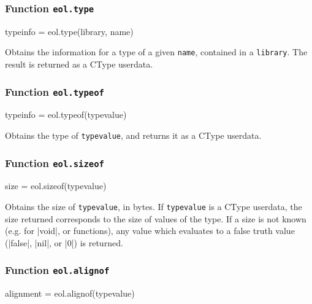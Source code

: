 \subsubsection{Function \texttt{eol.type}}
	\label{sec:eol-api-type}

\begin{luacode}
typeinfo = eol.type(library, name)
\end{luacode}

Obtains the information for a type of a given \texttt{name}, contained in
a \texttt{library}. The result is returned as a \textsf{CType} userdata.

%

\subsubsection{Function \texttt{eol.typeof}}
	\label{sec:eol-api-typeof}

\begin{luacode}
	typeinfo = eol.typeof(typevalue)
\end{luacode}

Obtains the type of \texttt{typevalue}, and returns it as a \textsf{CType}
userdata.

\subsubsection{Function \texttt{eol.sizeof}}

\begin{luacode}
  size = eol.sizeof(typevalue)
\end{luacode}

Obtains the size of \texttt{typevalue}, in bytes. If \texttt{typevalue} is
a \textsf{CType} userdata, the size returned corresponds to the size of values
of the type. If a size is not known (e.g. for \Mc|void|, or functions),
any value which evaluates to a false truth value (\Mlua|false|, \Mlua|nil|, or
\Mlua|0|) is returned.


\subsubsection{Function \texttt{eol.alignof}}
	\label{sec:eol-api-alignof}

\begin{luacode}
	alignment = eol.alignof(typevalue)
\end{luacode}

